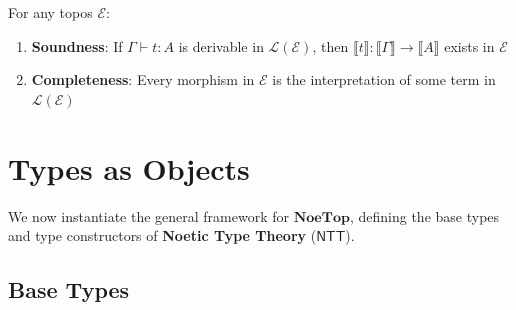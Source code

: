 \begin{theorem}
\label{thm:internal-language-correspondence}
For any topos $\mathcal{E}$:
\begin{enumerate}[label=(\alph*)]
  \item \textbf{Soundness}: If $\Gamma \vdash t : A$ is derivable in $\mathcal{L}(\mathcal{E})$,
        then $\llbracket t \rrbracket : \llbracket \Gamma \rrbracket \to \llbracket A \rrbracket$
        exists in $\mathcal{E}$
  \item \textbf{Completeness}: Every morphism in $\mathcal{E}$ is the interpretation
        of some term in $\mathcal{L}(\mathcal{E})$
\end{enumerate}
\end{theorem}

\section{Types as Objects}
\label{sec:types-as-objects}

We now instantiate the general framework for $\mathbf{NoeTop}$, defining the
base types and type constructors of \textbf{Noetic Type Theory} ($\mathsf{NTT}$).

\subsection{Base Types}
\label{subsec:base-types}

